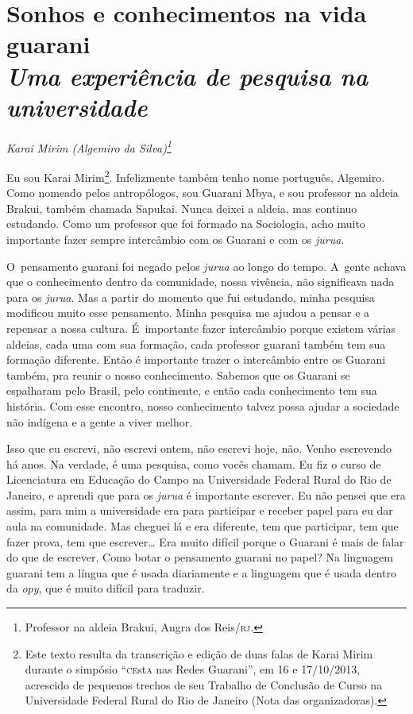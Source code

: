
\chapter*{Sonhos e conhecimentos na vida guarani\\
\large{\emph{Uma experiência de pesquisa na universidade}}}


\@openrighttrue\makeatother
\begin{flushright}
\emph{Karai Mirim (Algemiro da Silva)\footnote{Professor na aldeia Brakui,
Angra dos Reis/\textsc{rj}.}}
\end{flushright} 

\noindent
Eu sou Karai Mirim\footnote{Este texto resulta da transcrição e edição
de duas falas de Karai Mirim durante o simpósio ``\textsc{ce}st\textsc{a} nas Redes
Guarani'', em 16 e 17/10/2013, acrescido de pequenos trechos de seu
Trabalho de Conclusão de Curso na Universidade Federal Rural do Rio de
Janeiro (Nota das organizadoras).}. Infelizmente também tenho nome
português, Algemiro. Como nomeado pelos antropólogos, sou Guarani Mbya,
e sou professor na aldeia Brakui, também chamada Sapukai. Nunca deixei
a aldeia, mas continuo estudando. Como um professor que foi formado na
Sociologia, acho muito importante fazer sempre intercâmbio com os
Guarani e com os \emph{jurua}.

O~pensamento guarani foi negado pelos \emph{jurua} ao longo do tempo. A~gente
achava que o conhecimento dentro da comunidade, nossa vivência, não
significava nada para os \emph{jurua}. Mas a partir do momento que fui
estudando, minha pesquisa modificou muito esse pensamento. Minha
pesquisa me ajudou a pensar e a repensar a nossa cultura. É~importante
fazer intercâmbio porque existem várias aldeias, cada uma com sua
formação, cada professor guarani também tem sua formação diferente.
Então é importante trazer o intercâmbio entre os Guarani também, pra
reunir o nosso conhecimento. Sabemos que os Guarani se espalharam pelo
Brasil, pelo continente, e então cada conhecimento tem sua história.
Com esse encontro, nosso conhecimento talvez possa ajudar a sociedade
não indígena e a gente a viver melhor.

Isso que eu escrevi, não escrevi ontem, não escrevi hoje, não. Venho
escrevendo há anos. Na verdade, é uma pesquisa, como vocês chamam. Eu
fiz o curso de Licenciatura em Educação do Campo na Universidade
Federal Rural do Rio de Janeiro, e aprendi que para os \emph{jurua} é
importante escrever. Eu não pensei que era assim, para mim a
universidade era para participar e receber papel para eu dar aula na
comunidade. Mas cheguei lá e era diferente, tem que participar, tem que
fazer prova, tem que escrever\ldots{} Era muito difícil porque o Guarani é
mais de falar do que de escrever. Como botar o pensamento guarani no
papel? Na linguagem guarani tem a língua que é usada diariamente e a
linguagem que é usada dentro da \emph{opy}, que é muito difícil para traduzir.

